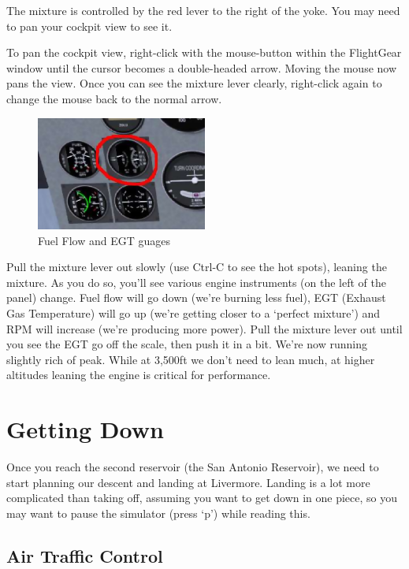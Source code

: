 The mixture is controlled by the red lever to the right of the yoke. 
You may need to pan your cockpit view to see it. 

To pan the cockpit view, right-click with the mouse-button within the 
FlightGear window until the cursor becomes a double-headed arrow. 
Moving the mouse now pans the view. Once you can see the mixture 
lever clearly, right-click again to change the mouse back to the normal arrow.

\begin{figure}[!htp]
\centering
\includegraphics[width=0.5\textwidth]{fuel_flow}
\caption{Fuel Flow and EGT guages\label{egt}}
\end{figure}

Pull the mixture lever out slowly (use Ctrl-C to see the hot spots), 
leaning the mixture. As you do so, you'll see various engine instruments 
(on the left of the panel) change. Fuel flow will go down (we're burning 
less fuel), EGT (Exhaust Gas Temperature) will go up (we're getting closer 
to a `perfect mixture') and RPM will increase (we're producing more power). 
Pull the mixture lever out until you see the EGT go off the scale, then 
push it in a bit. We're now running slightly rich of peak. While at 
3,500ft we don't need to lean much, at higher altitudes leaning the 
engine is critical for performance.

\section{Getting Down}

Once you reach the second reservoir (the San Antonio Reservoir), 
we need to start planning our descent and landing at Livermore. 
Landing is a lot more complicated than taking off, assuming you 
want to get down in one piece, so you may want to pause the 
simulator (press `p') while reading this.

\subsection{Air Traffic Control}

